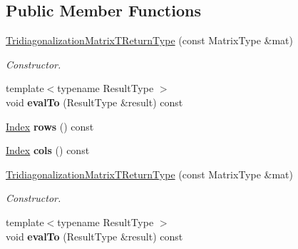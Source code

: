 \subsection*{Public Member Functions}
\begin{DoxyCompactItemize}
\item 
\hyperlink{struct_eigen_1_1internal_1_1_tridiagonalization_matrix_t_return_type_ac49f3c4df8b40dfa002c6e04e3d1b97f}{Tridiagonalization\+Matrix\+T\+Return\+Type} (const Matrix\+Type \&mat)
\begin{DoxyCompactList}\small\item\em Constructor. \end{DoxyCompactList}\item 
\mbox{\label{struct_eigen_1_1internal_1_1_tridiagonalization_matrix_t_return_type_a8e7c1fdb5f9e55ac810b3470484db76a}} 
{\footnotesize template$<$typename Result\+Type $>$ }\\void {\bfseries eval\+To} (Result\+Type \&result) const
\item 
\mbox{\label{struct_eigen_1_1internal_1_1_tridiagonalization_matrix_t_return_type_a273acab55c1ce70ad833d123ac65bbe1}} 
\hyperlink{namespace_eigen_a62e77e0933482dafde8fe197d9a2cfde}{Index} {\bfseries rows} () const
\item 
\mbox{\label{struct_eigen_1_1internal_1_1_tridiagonalization_matrix_t_return_type_aae70afbdf370aa7c9b66fba3da799b06}} 
\hyperlink{namespace_eigen_a62e77e0933482dafde8fe197d9a2cfde}{Index} {\bfseries cols} () const
\item 
\hyperlink{struct_eigen_1_1internal_1_1_tridiagonalization_matrix_t_return_type_ac49f3c4df8b40dfa002c6e04e3d1b97f}{Tridiagonalization\+Matrix\+T\+Return\+Type} (const Matrix\+Type \&mat)
\begin{DoxyCompactList}\small\item\em Constructor. \end{DoxyCompactList}\item 
\mbox{\label{struct_eigen_1_1internal_1_1_tridiagonalization_matrix_t_return_type_a8e7c1fdb5f9e55ac810b3470484db76a}} 
{\footnotesize template$<$typename Result\+Type $>$ }\\void {\bfseries eval\+To} (Result\+Type \&result) const

\end{DoxyCompactItemize}
